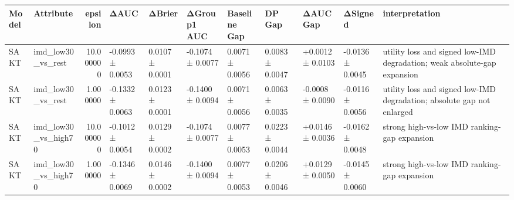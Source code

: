 \begin{tabular}{llrllllllll}
\toprule
Model & Attribute & epsilon & ΔAUC & ΔBrier & ΔGroup1 AUC & Baseline Gap & DP Gap & ΔAUC Gap & ΔSigned & interpretation \\
\midrule
SAKT & imd_low30_vs_rest & 10.000000 & -0.0993 ± 0.0053 & 0.0107 ± 0.0001 & -0.1074 ± 0.0077 & 0.0071 ± 0.0056 & 0.0083 ± 0.0047 & +0.0012 ± 0.0103 & -0.0136 ± 0.0045 & utility loss and signed low-IMD degradation; weak absolute-gap expansion \\
SAKT & imd_low30_vs_rest & 1.000000 & -0.1332 ± 0.0063 & 0.0123 ± 0.0001 & -0.1400 ± 0.0094 & 0.0071 ± 0.0056 & 0.0063 ± 0.0035 & -0.0008 ± 0.0090 & -0.0116 ± 0.0056 & utility loss and signed low-IMD degradation; absolute gap not enlarged \\
SAKT & imd_low30_vs_high70 & 10.000000 & -0.1012 ± 0.0054 & 0.0129 ± 0.0002 & -0.1074 ± 0.0077 & 0.0077 ± 0.0053 & 0.0223 ± 0.0044 & +0.0146 ± 0.0036 & -0.0162 ± 0.0048 & strong high-vs-low IMD ranking-gap expansion \\
SAKT & imd_low30_vs_high70 & 1.000000 & -0.1346 ± 0.0069 & 0.0146 ± 0.0002 & -0.1400 ± 0.0094 & 0.0077 ± 0.0053 & 0.0206 ± 0.0046 & +0.0129 ± 0.0050 & -0.0145 ± 0.0060 & strong high-vs-low IMD ranking-gap expansion \\
\bottomrule
\end{tabular}
